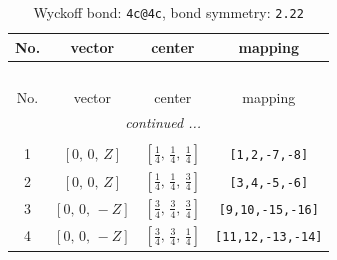 \documentclass[fleqn,8pt]{jsarticle}
\begin{document}
\renewcommand{\arraystretch}{1.2}
\begin{longtable}{cccc}
\caption{Wyckoff bond: {\tt 4c@4c}, bond symmetry: {\tt 2.22}}
 \\
 \hline \hline
No. & vector & center & mapping \\ \hline \endfirsthead

\multicolumn{3}{l}{\tablename\ \thetable{}} \\
 \hline \hline
No. & vector & center & mapping \\ \hline \endhead

 \hline \hline
\multicolumn{3}{r}{\footnotesize\it continued ...} \\ \endfoot

 \hline \hline
\multicolumn{3}{r}{} \\ \endlastfoot

1 & $\left[ 0,\, 0,\, Z \right]$ & $\left[ \frac{1}{4},\, \frac{1}{4},\, \frac{1}{4} \right]$ & {\tt [1,2,-7,-8]} \\ \hline
2 & $\left[ 0,\, 0,\, Z \right]$ & $\left[ \frac{1}{4},\, \frac{1}{4},\, \frac{3}{4} \right]$ & {\tt [3,4,-5,-6]} \\ \hline
3 & $\left[ 0,\, 0,\, - Z \right]$ & $\left[ \frac{3}{4},\, \frac{3}{4},\, \frac{3}{4} \right]$ & {\tt [9,10,-15,-16]} \\ \hline
4 & $\left[ 0,\, 0,\, - Z \right]$ & $\left[ \frac{3}{4},\, \frac{3}{4},\, \frac{1}{4} \right]$ & {\tt [11,12,-13,-14]} \\
\end{longtable}
\renewcommand{\arraystretch}{1.2}
\end{document}
